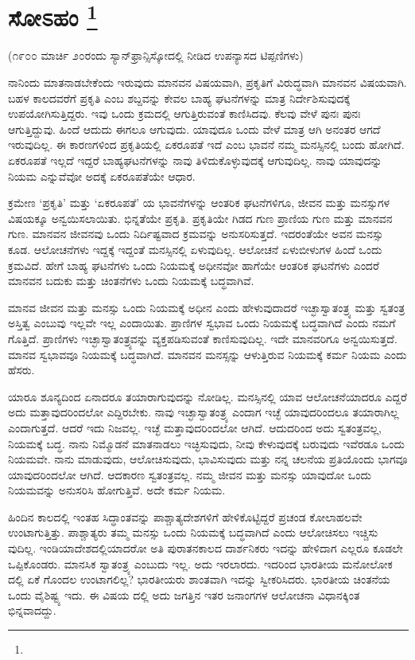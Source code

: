 
\chapter[ಸೋಽಹಂ ]{ಸೋಽಹಂ \protect\footnote{}}

\centerline{(೧೯೦೦ ಮಾರ್ಚಿ ೨೦ರಂದು ಸ್ಯಾನ್​ಫ್ರಾನ್ಸಿಸ್ಕೋದಲ್ಲಿ ನೀಡಿದ ಉಪನ್ಯಾಸದ ಟಿಪ್ಪಣಿಗಳು)}

ನಾನಿಂದು ಮಾತನಾಡಬೇಕೆಂದು ಇರುವುದು ಮಾನವನ ವಿಷಯವಾಗಿ, ಪ್ರಕೃತಿಗೆ ವಿರುದ್ಧವಾಗಿ ಮಾನವನ ವಿಷಯವಾಗಿ. ಬಹಳ ಕಾಲದವರೆಗೆ ಪ್ರಕೃತಿ ಎಂಬ ಶಬ್ದವನ್ನು ಕೇವಲ ಬಾಹ್ಯ ಘಟನೆಗಳನ್ನು ಮಾತ್ರ ನಿರ್ದೇಶಿಸುವುದಕ್ಕೆ ಉಪಯೋಗಿಸುತ್ತಿದ್ದರು. ಇವು ಒಂದು ಕ್ರಮದಲ್ಲಿ ಆಗುತ್ತಿರುವಂತೆ ಕಾಣಿಸಿದವು. ಕೆಲವು ವೇಳೆ ಪುನಃ ಪುನಃ ಆಗುತ್ತಿದ್ದುವು. ಹಿಂದೆ ಆದುದು ಈಗಲೂ ಆಗುವುದು. ಯಾವುದೂ ಒಂದು ವೇಳೆ ಮಾತ್ರ ಆಗಿ ಅನಂತರ ಆಗದೆ ಇರುವುದಿಲ್ಲ. ಈ ಕಾರಣಗಳಿಂದ ಪ್ರಕೃತಿಯಲ್ಲಿ ಏಕರೂಪತೆ ಇದೆ ಎಂಬ ಭಾವನೆ ನಮ್ಮ ಮನಸ್ಸಿನಲ್ಲಿ ಬಂದು ಹೋಗಿದೆ. ಏಕರೂಪತೆ ಇಲ್ಲದೆ ಇದ್ದರೆ ಬಾಹ್ಯಘಟನೆಗಳನ್ನು ನಾವು ತಿಳಿದುಕೊಳ್ಳುವುದಕ್ಕೆ ಆಗುವುದಿಲ್ಲ. ನಾವು ಯಾವುದನ್ನು ನಿಯಮ ಎನ್ನುವೆವೋ ಅದಕ್ಕೆ ಏಕರೂಪತೆಯೇ ಆಧಾರ.

ಕ್ರಮೇಣ ‘ಪ್ರಕೃತಿ’ ಮತ್ತು ‘ಏಕರೂಪತೆ’ ಯ ಭಾವನೆಗಳನ್ನು ಆಂತರಿಕ ಘಟನೆಗಳಿಗೂ, ಜೀವನ ಮತ್ತು ಮನಸ್ಸುಗಳ ವಿಷಯಕ್ಕೂ ಅನ್ವಯಿಸಲಾಯಿತು. ಭಿನ್ನತೆಯೇ ಪ್ರಕೃತಿ. ಪ್ರಕೃತಿಯೇ ಗಿಡದ ಗುಣ ಪ್ರಾಣಿಯ ಗುಣ ಮತ್ತು ಮಾನವನ ಗುಣ. ಮಾನವನ ಜೀವನವು ಒಂದು ನಿರ್ದಿಷ್ಟವಾದ ಕ್ರಮವನ್ನು ಅನುಸರಿಸುತ್ತದೆ. ಇದರಂತೆಯೇ ಅವನ ಮನಸ್ಸು ಕೂಡ. ಆಲೋಚನೆಗಳು ಇದ್ದಕ್ಕೆ ಇದ್ದಂತೆ ಮನಸ್ಸಿನಲ್ಲಿ ಏಳುವುದಿಲ್ಲ. ಆಲೋಚನೆ ಏಳುಬೀಳುಗಳ ಹಿಂದೆ ಒಂದು ಕ್ರಮವಿದೆ. ಹೇಗೆ ಬಾಹ್ಯ ಘಟನೆಗಳು ಒಂದು ನಿಯಮಕ್ಕೆ ಅಧೀನವೋ ಹಾಗೆಯೇ ಆಂತರಿಕ ಘಟನೆಗಳು ಎಂದರೆ ಮಾನವನ ಬದುಕು ಮತ್ತು ಚಿಂತನೆಗಳು ಒಂದು ನಿಯಮಕ್ಕೆ ಬದ್ಧವಾಗಿವೆ.

ಮಾನವ ಜೀವನ ಮತ್ತು ಮನಸ್ಸು ಒಂದು ನಿಯಮಕ್ಕೆ ಅಧೀನ ಎಂದು ಹೇಳುವುದಾದರೆ ಇಚ್ಛಾಸ್ವಾತಂತ್ರ್ಯ ಮತ್ತು ಸ್ವತಂತ್ರ ಅಸ್ತಿತ್ವ ಎಂಬುವು ಇಲ್ಲವೇ ಇಲ್ಲ ಎಂದಾಯಿತು. ಪ್ರಾಣಿಗಳ ಸ್ವಭಾವ ಒಂದು ನಿಯಮಕ್ಕೆ ಬದ್ಧವಾಗಿದೆ ಎಂದು ನಮಗೆ ಗೊತ್ತಿದೆ. ಪ್ರಾಣಿಗಳು ಇಚ್ಛಾಸ್ವಾತಂತ್ರ್ಯವನ್ನು ವ್ಯಕ್ತಪಡಿಸುವಂತೆ ಕಾಣಿಸುವುದಿಲ್ಲ. ಇದೇ ಮಾನವರಿಗೂ ಅನ್ವಯಿಸುತ್ತದೆ. ಮಾನವ ಸ್ವಭಾವವೂ ನಿಯಮಕ್ಕೆ ಬದ್ಧವಾಗಿದೆ. ಮಾನವನ ಮನಸ್ಸನ್ನು ಆಳುತ್ತಿರುವ ನಿಯಮಕ್ಕೆ ಕರ್ಮ ನಿಯಮ ಎಂದು ಹೆಸರು.

ಯಾರೂ ಶೂನ್ಯದಿಂದ ಏನಾದರೂ ತಯಾರಾಗುವುದನ್ನು ನೋಡಿಲ್ಲ. ಮನಸ್ಸಿನಲ್ಲಿ ಯಾವ ಆಲೋಚನೆಯಾದರೂ ಎದ್ದರೆ ಅದು ಮತ್ತಾವುದರಿಂದಲೋ ಎದ್ದಿರಬೇಕು. ನಾವು ಇಚ್ಛಾಸ್ವಾತಂತ್ರ್ಯ ಎಂದಾಗ ಇಚ್ಛೆ ಯಾವುದರಿಂದಲೂ ತಯಾರಾಗಿಲ್ಲ ಎಂದಾಗುತ್ತದೆ. ಆದರೆ ಇದು ನಿಜವಲ್ಲ. ಇಚ್ಛೆ ಮತ್ತಾವುದರಿಂದಲೋ ಆಗಿದೆ. ಆದುದರಿಂದ ಅದು ಸ್ವತಂತ್ರವಲ್ಲ, ನಿಯಮಕ್ಕೆ ಬದ್ಧ. ನಾನು ನಿಮ್ಮೊಡನೆ ಮಾತನಾಡಲು ಇಚ್ಛಿಸುವುದು, ನೀವು ಕೇಳುವುದಕ್ಕೆ ಬರುವುದು ಇವೆರಡೂ ಒಂದು ನಿಯಮವೇ. ನಾನು ಮಾಡುವುದು, ಆಲೋಚಿಸುವುದು, ಭಾವಿಸುವುದು ಮತ್ತು ನನ್ನ ಚಲನೆಯ ಪ್ರತಿಯೊಂದು ಭಾಗವೂ ಯಾವುದರಿಂದಲೋ ಆಗಿದೆ. ಆದಕಾರಣ ಸ್ವತಂತ್ರವಲ್ಲ. ನಮ್ಮ ಜೀವನ ಮತ್ತು ಮನಸ್ಸು ಯಾವುದೋ ಒಂದು ನಿಯಮವನ್ನು ಅನುಸರಿಸಿ ಹೋಗುತ್ತಿವೆ. ಅದೇ ಕರ್ಮ ನಿಯಮ.

ಹಿಂದಿನ ಕಾಲದಲ್ಲಿ ಇಂತಹ ಸಿದ್ಧಾಂತವನ್ನು ಪಾಶ್ಚಾತ್ಯದೇಶಗಳಿಗೆ ಹೇಳಿಕೊಟ್ಟಿದ್ದರೆ ಪ್ರಚಂಡ ಕೋಲಾಹಲವೇ ಉಂಟಾಗುತ್ತಿತ್ತು. ಪಾಶ್ಚಾತ್ಯರು ತಮ್ಮ ಮನಸ್ಸು ಒಂದು ನಿಯಮಕ್ಕೆ ಬದ್ಧವಾಗಿದೆ ಎಂದು ಆಲೋಚಿಸಲು ಇಚ್ಚಿಸು ವುದಿಲ್ಲ. ಇಂಡಿಯಾದೇಶದಲ್ಲಿಯಾದರೋ ಅತಿ ಪುರಾತನಕಾಲದ ದಾರ್ಶನಿಕರು ಇದನ್ನು ಹೇಳಿದಾಗ ಎಲ್ಲರೂ ಕೂಡಲೇ ಒಪ್ಪಿಕೊಂಡರು. ಮಾನಸಿಕ ಸ್ವಾತಂತ್ರ್ಯ ಎಂಬುದು ಇಲ್ಲ. ಅದು ಇರಲಾರದು. ಇದರಿಂದ ಭಾರತೀಯ ಮನೋಲೋಕ ದಲ್ಲಿ ಏಕೆ ಗೊಂದಲ ಉಂಟಾಗಲಿಲ್ಲ? ಭಾರತೀಯರು ಶಾಂತವಾಗಿ ಇದನ್ನು ಸ್ವೀಕರಿಸಿದರು. ಭಾರತೀಯ ಚಿಂತನೆಯ ಒಂದು ವೈಶಿಷ್ಟ್ಯ ಇದು. ಈ ವಿಷಯ ದಲ್ಲಿ ಅದು ಜಗತ್ತಿನ ಇತರ ಜನಾಂಗಗಳ ಆಲೋಚನಾ ವಿಧಾನಕ್ಕಿಂತ ಭಿನ್ನವಾದದ್ದು.

